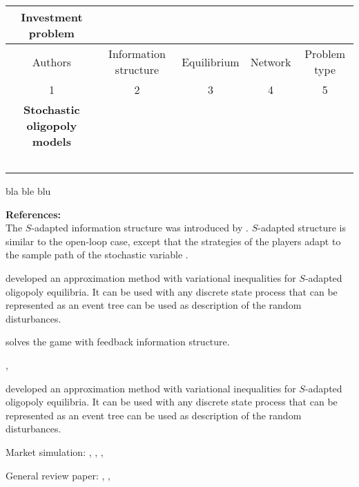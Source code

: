 \begin{landscape}
\begin{table}
\begin{tabular}[h]{ccccc}
\hline
\textbf{Investment problem}\\
\hline
  Authors & Information structure & Equilibrium & Network & Problem type \\
1 & 2 & 3 & 4 & 5 \\
\hline
\textbf{Stochastic oligopoly models}\\
\hline
\cite{Salant1982}\\
\cite{Wolf1997}\\
\cite{Haurie2001}\\
\cite{Haurie2002}\\
\cite{Murto2004}
\end{tabular}
\end{table}
bla ble blu


\textbf{References:} \cite{Salant1982, Wolf1997, Haurie2001, Haurie2002, Pineau2003, Murto2004}\\


The $S$-adapted information structure was introduced by \cite{Haurie1990}.
$S$-adapted structure is similar to the open-loop case, except that the strategies of the players adapt to the sample path of the stochastic variable \citep[see][pg. 128]{Pineau2003}.

\cite{Haurie2002} developed an approximation method with variational inequalities for $S$-adapted oligopoly equilibria. It can be used with any discrete state process that can be represented as an event tree can be used as description of the random disturbances.

\cite{Murto2004} solves the game with feedback information structure.

\cite{Haurie2001}, \cite{Genc2007}

developed an approximation method with variational inequalities for $S$-adapted oligopoly equilibria. It can be used with any discrete state process that can be represented as an event tree can be used as description of the random disturbances.


Market simulation: \cite{Torre2003}, \cite{Valenzuela2007}, \cite{Hobbs2001},\cite{Otero-Novas2000}

General review paper: \cite{Neuhoff2005}, \cite{Ventosa2005}, \cite{Kahn1998}

\end{landscape}
